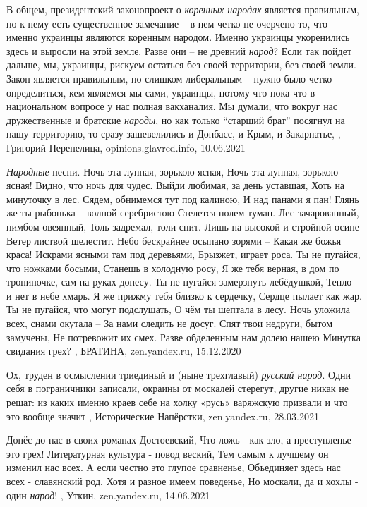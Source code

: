 В общем, президентский законопроект о \emph{коренных народах} является
правильным, но к нему есть существенное замечание – в нем четко не очерчено то,
что именно украинцы являются коренным народом. Именно украинцы укоренились
здесь и выросли на этой земле. Разве они – не древний \emph{народ}? Если так
пойдет дальше, мы, украинцы, рискуем остаться без своей территории, без своей
земли.  Закон является правильным, но слишком либеральным – нужно было четко
определиться, кем являемся мы сами, украинцы, потому что пока что в
национальном вопросе у нас полная вакханалия. Мы думали, что вокруг нас
дружественные и братские \emph{народы}, но как только \enquote{старший брат}
посягнул на нашу территорию, то сразу зашевелились и Донбасс, и Крым, и
Закарпатье,
, 
Григорий Перепелица, opinions.glavred.info, 10.06.2021

\emph{Народные} песни. Ночь эта лунная, зорькою ясная, Ночь эта лунная,
зорькою ясная!  Видно, что ночь для чудес.  Выйди любимая, за день уставшая,
Хоть на минуточку в лес.  Сядем, обнимемся тут под калиною, И над панами я пан!
Глянь же ты рыбонька – волной серебристою Стелется полем туман.  Лес
зачарованный, нимбом овеянный, Толь задремал, толи спит. Лишь на высокой и
стройной осине Ветер листвой шелестит.  Небо бескрайнее осыпано зорями – Какая
же божья краса!  Искрами ясными там под деревьями, Брызжет, играет роса.  Ты не
пугайся, что ножками босыми, Станешь в холодную росу, Я же тебя верная, в дом
по тропиночке, сам на руках донесу.  Ты не пугайся замерзнуть лебёдушкой, Тепло
– и нет в небе хмарь.  Я же прижму тебя близко к сердечку, Сердце пылает как
жар. Ты не пугайся, что могут подслушать, О чём ты шептала в лесу.  Ночь
уложила всех, снами окутала – За нами следить не досуг.  Спят твои недруги,
бытом замучены, Не потревожит их смех.  Разве обделенным нам долею нашею
Минутка свидания грех?
, 
БРАТИНА, zen.yandex.ru, 15.12.2020

Ох, труден в осмыслении триединый и (ныне трехглавый) \emph{русский народ}. Одни себя
в пограничники записали, окраины от москалей стерегут, другие никак не решат:
из каких именно краев себе на холку «русь» варяжскую призвали и что это вообще
значит
, 
Исторические Напёрстки, zen.yandex.ru, 28.03.2021

Донёс до нас в своих романах Достоевский, Что ложь - как зло, а преступленье -
это грех! Литературная культура - повод веский, Тем самым к лучшему он изменил
нас всех. А если честно это глупое сравненье, Объединяет здесь нас всех -
славянский род, Хотя и разное имеем поведенье, Но москали, да и хохлы - один
\emph{народ}!
, 
Уткин, zen.yandex.ru, 14.06.2021
